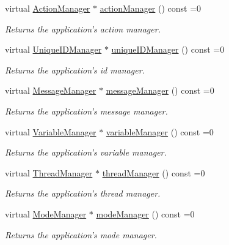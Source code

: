 \begin{DoxyCompactItemize}
virtual \hyperlink{class_core_1_1_action_manager}{Action\-Manager} $\ast$ \hyperlink{group___core_plugin_ga5e44e7795213bb2627acfa08a13f6a12}{action\-Manager} () const =0
\begin{DoxyCompactList}\small\item\em Returns the application's action manager. \end{DoxyCompactList}\item 
virtual \hyperlink{class_core_1_1_unique_i_d_manager}{Unique\-I\-D\-Manager} $\ast$ \hyperlink{group___core_plugin_ga4485869beb58de37e2e2e1a5fe0db6eb}{unique\-I\-D\-Manager} () const =0
\begin{DoxyCompactList}\small\item\em Returns the application's id manager. \end{DoxyCompactList}\item 
virtual \hyperlink{class_core_1_1_message_manager}{Message\-Manager} $\ast$ \hyperlink{group___core_plugin_gacc045be864edcb663fd9483b0690769e}{message\-Manager} () const =0
\begin{DoxyCompactList}\small\item\em Returns the application's message manager. \end{DoxyCompactList}\item 
virtual \hyperlink{class_core_1_1_variable_manager}{Variable\-Manager} $\ast$ \hyperlink{group___core_plugin_ga1e38c317f3da32d2cf97a92aad4da84f}{variable\-Manager} () const =0
\begin{DoxyCompactList}\small\item\em Returns the application's variable manager. \end{DoxyCompactList}\item 
virtual \hyperlink{class_core_1_1_thread_manager}{Thread\-Manager} $\ast$ \hyperlink{group___core_plugin_ga8620bdc9a630b0572af2a5fd908936c6}{thread\-Manager} () const =0
\begin{DoxyCompactList}\small\item\em Returns the application's thread manager. \end{DoxyCompactList}\item 
virtual \hyperlink{class_core_1_1_mode_manager}{Mode\-Manager} $\ast$ \hyperlink{group___core_plugin_gae36180b31ba67d38888143d60fceb220}{mode\-Manager} () const =0
\begin{DoxyCompactList}\small\item\em Returns the application's mode manager. \end{DoxyCompactList}\item 

\end{DoxyCompactItemize}
